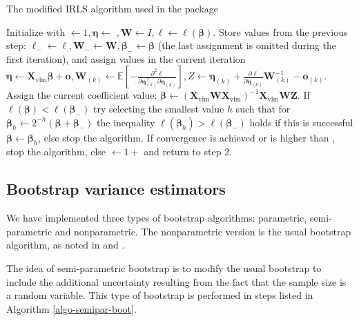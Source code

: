 \documentclass[
]{jss}
\newcommand{\1}{\mathcal{I}} \newcommand{\bZero}{\boldsymbol{0}}
\begin{document}
\begin{algorithm}[ht!]
\small
\caption{The modified IRLS algorithm used in the  package}
\label{algo-estimation}\DontPrintSemicolon
{} Initialize with $\leftarrow 1, \boldsymbol{\eta}\leftarrow$
    $, \boldsymbol{W}\leftarrow I, \ell\leftarrow\ell(\boldsymbol{\beta})$.\;
 Store values from the previous step: 
    $\ell_{-}\leftarrow\ell, \boldsymbol{W}_{-}\leftarrow\boldsymbol{W}, \boldsymbol{\beta}_{-}\leftarrow\boldsymbol{\beta}$ 
    (the last assignment is omitted during the first iteration), and assign values in the current iteration 
    $\displaystyle\boldsymbol{\eta}\leftarrow\boldsymbol{X}_{\text{vlm}}\boldsymbol{\beta}+\boldsymbol{o}, \boldsymbol{W}_{(k)}\leftarrow\mathbb{E}\left[-\frac{\partial^{2}\ell}{\partial\boldsymbol{\eta}_{(k)}^\top\partial\boldsymbol{\eta}_{(k)}}\right], Z\leftarrow\boldsymbol{\eta}_{(k)}+\frac{\partial\ell}{\partial\boldsymbol{\eta}_{(k)}}\boldsymbol{W}_{(k)}^{-1}-\boldsymbol{o}_{(k)}$.\;
 Assign the current coefficient value: 
    $\boldsymbol{\beta}\leftarrow\left(\boldsymbol{X}_{\text{vlm}}\boldsymbol{W}\boldsymbol{X}_{\text{vlm}}\right)^{-1}\boldsymbol{X}_{\text{vlm}}\boldsymbol{W}\boldsymbol{Z}$.\;
 If $\ell(\boldsymbol{\beta})<\ell(\boldsymbol{\beta}_{-})$ try selecting the smallest value $h$ such that for
    $\boldsymbol{\beta}_{h}\leftarrow2^{-h}\left(\boldsymbol{\beta}+\boldsymbol{\beta}_{-}\right)$ the inequality $\ell(\boldsymbol{\beta}_{h})>\ell(\boldsymbol{\beta}_{-})$
    holds if this is successful $\boldsymbol{\beta}\leftarrow\boldsymbol{\beta}_{h}$, else stop the algorithm.\;
 If convergence is achieved or  is higher than , stop the algorithm, 
    else $\leftarrow 1+$ and return to step 2.
\end{algorithm}

\subsection{Bootstrap variance estimators}\label{sec-boostrap}

We have implemented three types of bootstrap algorithms: parametric,
semi-parametric and nonparametric. The nonparametric version is the
usual bootstrap algorithm, as noted in \cite{norrpoll} and \cite{zwane}.

The idea of semi-parametric bootstrap is to modify the usual bootstrap
to include the additional uncertainty resulting from the fact that the
sample size is a random variable. This type of bootstrap is performed in
steps listed in Algorithm \ref{algo-semipar-boot}.
\end{document}
